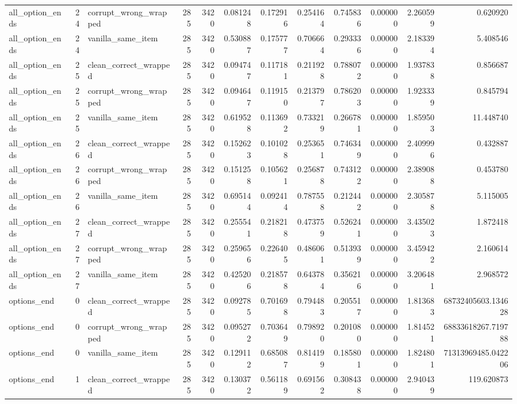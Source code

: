 \begin{tabular}{lrlrrrrrrrrr}
all\_option\_ends & 24 & corrupt\_wrong\_wrapped & 285 & 3420 & 0.081248 & 0.172916 & 0.254164 & 0.745836 & 0.000000 & 2.260599 & 0.620920 \\
all\_option\_ends & 24 & vanilla\_same\_item & 285 & 3420 & 0.530887 & 0.175777 & 0.706664 & 0.293336 & 0.000000 & 2.183394 & 5.408546 \\
all\_option\_ends & 25 & clean\_correct\_wrapped & 285 & 3420 & 0.094747 & 0.117181 & 0.211928 & 0.788072 & 0.000000 & 1.937838 & 0.856687 \\
all\_option\_ends & 25 & corrupt\_wrong\_wrapped & 285 & 3420 & 0.094647 & 0.119150 & 0.213797 & 0.786203 & 0.000000 & 1.923339 & 0.845794 \\
all\_option\_ends & 25 & vanilla\_same\_item & 285 & 3420 & 0.619528 & 0.113692 & 0.733219 & 0.266781 & 0.000000 & 1.859503 & 11.448740 \\
all\_option\_ends & 26 & clean\_correct\_wrapped & 285 & 3420 & 0.152623 & 0.101028 & 0.253651 & 0.746349 & 0.000000 & 2.409996 & 0.432887 \\
all\_option\_ends & 26 & corrupt\_wrong\_wrapped & 285 & 3420 & 0.151258 & 0.105621 & 0.256878 & 0.743122 & 0.000000 & 2.389088 & 0.453780 \\
all\_option\_ends & 26 & vanilla\_same\_item & 285 & 3420 & 0.695144 & 0.092414 & 0.787558 & 0.212442 & 0.000000 & 2.305878 & 5.115005 \\
all\_option\_ends & 27 & clean\_correct\_wrapped & 285 & 3420 & 0.255541 & 0.218218 & 0.473759 & 0.526241 & 0.000000 & 3.435023 & 1.872418 \\
all\_option\_ends & 27 & corrupt\_wrong\_wrapped & 285 & 3420 & 0.259656 & 0.226405 & 0.486061 & 0.513939 & 0.000000 & 3.459422 & 2.160614 \\
all\_option\_ends & 27 & vanilla\_same\_item & 285 & 3420 & 0.425206 & 0.218578 & 0.643784 & 0.356216 & 0.000000 & 3.206481 & 2.968572 \\
options\_end & 0 & clean\_correct\_wrapped & 285 & 3420 & 0.092785 & 0.701698 & 0.794483 & 0.205517 & 0.000000 & 1.813683 & 68732405603.134628 \\
options\_end & 0 & corrupt\_wrong\_wrapped & 285 & 3420 & 0.095272 & 0.703649 & 0.798920 & 0.201080 & 0.000000 & 1.814521 & 68833618267.719788 \\
options\_end & 0 & vanilla\_same\_item & 285 & 3420 & 0.129112 & 0.685087 & 0.814199 & 0.185801 & 0.000000 & 1.824801 & 71313969485.042206 \\
options\_end & 1 & clean\_correct\_wrapped & 285 & 3420 & 0.130372 & 0.561189 & 0.691562 & 0.308438 & 0.000000 & 2.940439 & 119.620873 \\

\end{tabular}
